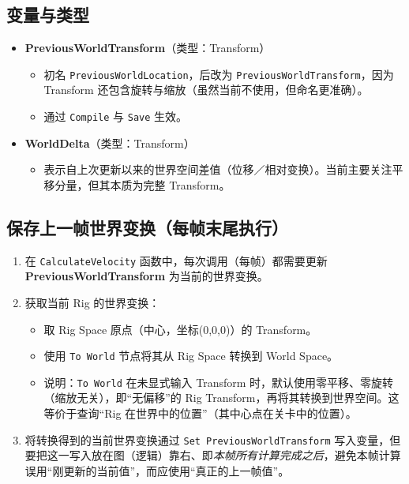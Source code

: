\documentclass[math,code,12pt]{amznotes}
\newcommand{\il}[1]{\texttt{#1}}%
\begin{document}
\subsection*{变量与类型}
\begin{itemize}
\item \textbf{PreviousWorldTransform}（类型：Transform）
\begin{itemize}
\item 初名 \texttt{PreviousWorldLocation}，后改为 \texttt{PreviousWorldTransform}，因为 Transform 还包含旋转与缩放（虽然当前不使用，但命名更准确）。
\item 通过 \texttt{Compile} 与 \texttt{Save} 生效。
\end{itemize}
\item \textbf{WorldDelta}（类型：Transform）
\begin{itemize}
\item 表示自上次更新以来的世界空间差值（位移／相对变换）。当前主要关注平移分量，但其本质为完整 Transform。
\end{itemize}
\end{itemize}

\subsection*{保存上一帧世界变换（每帧末尾执行）}
\begin{enumerate}
\item 在 \il{CalculateVelocity} 函数中，每次调用（每帧）都需要更新 \textbf{PreviousWorldTransform} 为当前的世界变换。
\item 获取当前 Rig 的世界变换：
\begin{itemize}
\item 取 Rig Space 原点（中心，坐标(0,0,0)）的 Transform。
\item 使用 \il{To World} 节点将其从 Rig Space 转换到 World Space。
\item 说明：\il{To World} 在未显式输入 Transform 时，默认使用零平移、零旋转（缩放无关），即“无偏移”的 Rig Transform，再将其转换到世界空间。这等价于查询“Rig 在世界中的位置”（其中心点在关卡中的位置）。
\end{itemize}
\item 将转换得到的当前世界变换通过 \il{Set PreviousWorldTransform} 写入变量，但要把这一写入放在图（逻辑）靠右、即\emph{本帧所有计算完成之后}，避免本帧计算误用“刚更新的当前值”，而应使用“真正的上一帧值”。
\end{enumerate}
\end{document}
